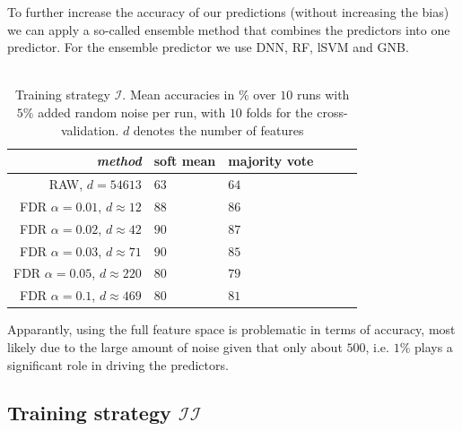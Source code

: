 \documentclass[a4paper,10pt]{article}
\begin{document}
%
To further increase the accuracy of our predictions (without increasing the bias) we can apply a so-called ensemble method that combines the predictors into one predictor. For the ensemble predictor we use DNN, RF, lSVM and GNB. \\ \\
%
%
\begin{table}[htp]
\centering
\begin{tabular}{rlllll}

\textit{method}						& soft mean     & majority vote  \\
							\hline
RAW, $d=54613$ 						&    $63$       &   $64$         \\
FDR $\alpha=0.01$, $d\approx 12$ 	&    $88$       &   $86$         \\
FDR $\alpha=0.02$, $d\approx 42$ 	&    $90$       &   $87$         \\
FDR $\alpha=0.03$, $d\approx 71$ 	&    $90$       &   $85$         \\
FDR $\alpha=0.05$, $d\approx 220$ 	&    $80$       &   $79$         \\
FDR $\alpha=0.1$,  $d\approx 469$ 	&    $80$       &   $81$           
\end{tabular}
\caption{Training strategy $\mathcal{I}$. Mean accuracies in $\%$ over $10$ runs with $5\%$ added random noise per run, with $10$ folds for the cross-validation. $d$ denotes the number of features}
\label{tab:diversitymetrics_ensemble}
\end{table}
%
Apparantly, using the full feature space is problematic in terms of accuracy, most likely due to the large amount of noise given that 
only about $500$, i.e. $1\%$ plays a significant role in driving the predictors.
%
%
\subsection{Training strategy $\mathcal{II}$}

\end{document}
